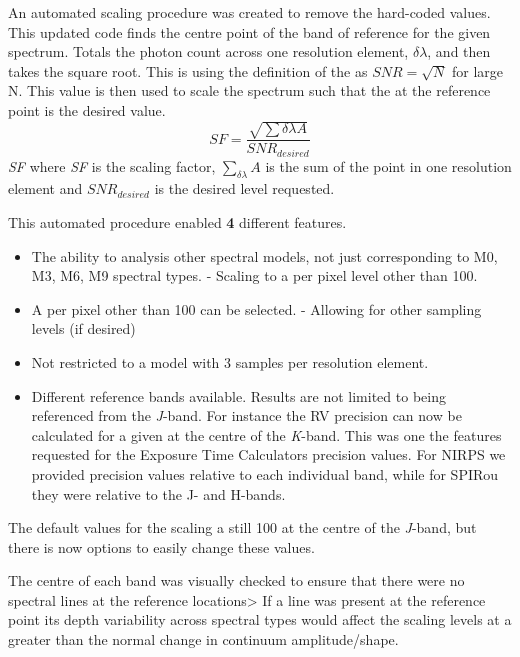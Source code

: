An automated \snr{} scaling procedure was created to remove the hard-coded values.
This updated code finds the centre point of the band of reference for the given spectrum.
Totals the photon count across one resolution element, \(\delta\lambda\), and then takes the square root.
This is using the definition of the \snr{} as \({SNR} = \sqrt{N}\) for large N.
This value is then used to scale the spectrum such that the \snr{} at the reference point is the desired value.
\begin{equation}
    SF =  \frac{\sqrt{\sum{\delta\lambda} A}} {SNR_{desired}}
\end{equation}
\textit{SF} where \textit{SF} is the scaling factor, \(\sum_{\delta\lambda} A\) is the sum of the point in one resolution element and \({SNR}_{desired}\) is the desired \snr{} level requested.

This automated procedure enabled {\red{}\textbf{4}} different features.
\begin{itemize}
\item The ability to analysis other spectral models, not just corresponding to {M0}, {M3}, {M6}, {M9} spectral types.
    - Scaling to a \snr{} per pixel level other than 100.
\item    A \snr{} per pixel other than 100 can be selected.
    - Allowing for other sampling levels (if desired)
\item      Not restricted to a model with 3 samples per resolution element.
\item Different reference bands available.
    Results are not limited to being referenced from the \textit{J}-band.
For instance the {RV} precision can now be calculated for a given \snr{} at the centre of the \textit{K}-band.
This was one the features requested for the Exposure Time Calculators precision values.
For {NIRPS} we provided precision values relative to each individual band, while for {SPIRou} they were relative to the {J}- and {H}-bands.
\end{itemize}
The default values for the \snr{} scaling a still 100 at the centre of the \textit{J}-band, but there is now options to easily change these values.

The centre of each band was visually checked to ensure that there were no spectral lines at the reference locations> If a line was present at the reference point its depth variability across spectral types would affect the \snr{} scaling levels at a greater than the normal change in continuum amplitude/shape.

